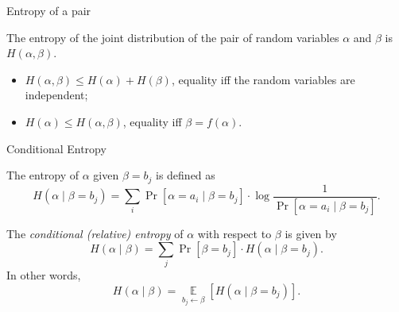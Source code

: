 \documentclass[aspectratio=169]{beamer}
\DeclareMathOperator*{\E}{\mathbb{E}}
\begin{document}
\begin{frame}{Entropy of a pair}
\begin{definition}
    The entropy of the joint distribution of the pair of random variables \(\alpha\) and \(\beta\) is \(H(\alpha, \beta)\).
\end{definition}

\begin{lemma}
    \begin{itemize}
        \item \(H(\alpha, \beta) \le H(\alpha) + H(\beta)\), equality iff the random variables are independent;
        \item \(H(\alpha) \le H(\alpha, \beta)\), equality iff \(\beta = f(\alpha)\).
    \end{itemize}
\end{lemma}
\end{frame}


\begin{frame}{Conditional Entropy}
\begin{definition}\label{def:cond-entropy1}
    The entropy of \(\alpha\) given \(\beta = b_j\) is defined as
    \[
    H(\alpha\mid\beta = b_j) = \sum_i \Pr[\alpha = a_i\mid \beta = b_j] \cdot
    \log\frac{1}{\Pr[\alpha = a_i\mid \beta = b_j]}.
    \]
\end{definition}
\vspace{-5mm}

\begin{definition}\label{def:cond-entropy2}
    The \emph{conditional (relative) entropy} of \(\alpha\) with respect to \(\beta\) is given by
    \[
    H(\alpha\mid\beta) = \sum_j \Pr[\beta = b_j] \cdot H(\alpha\mid \beta = b_j).
    \]
    In other words,
    \[
    H(\alpha\mid\beta) = \E\limits_{b_j \gets \beta}[H(\alpha\mid \beta = b_j)].
    \]
\end{definition}
\end{frame}
\end{document}
